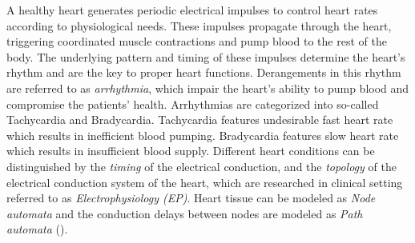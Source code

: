 A healthy heart generates periodic electrical impulses to control heart rates according to physiological needs. 
These impulses propagate through the heart, triggering coordinated muscle contractions and pump blood to the rest of the body. 
The underlying pattern and timing of these impulses determine the heart's rhythm and are the key to proper heart functions. 
Derangements in this rhythm are referred to as \emph{arrhythmia}, which impair the heart's ability to pump blood and compromise the patients' health. 
Arrhythmias are categorized into so-called Tachycardia and Bradycardia. 
Tachycardia features undesirable fast heart rate which results in inefficient blood pumping. Bradycardia features slow heart rate which results in insufficient blood supply. Different heart conditions can be distinguished by the \emph{timing} of the electrical conduction, and the \emph{topology} of the electrical conduction system of the heart, which are researched in clinical setting referred to as \emph{Electrophysiology (EP)}\cite{josephson}. 
Heart tissue can be modeled as \emph{Node automata} and the conduction delays between nodes are modeled as \emph{Path automata} (). 



%
 
